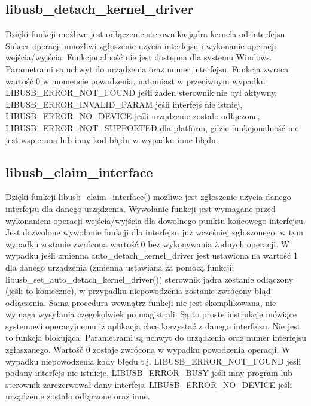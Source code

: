 \documentclass{BscUS}
\begin{document}
\subsection{libusb\_detach\_kernel\_driver}
\noindent Dzięki funkcji możliwe jest odłączenie sterownika jądra kernela od interfejsu.
Sukces operacji umożliwi zgłoszenie użycia interfejsu i wykonanie operacji wejścia/wyjścia.
Funkcjonalność nie jest dostępna dla systemu Windows.
Parametrami są uchwyt do urządzenia oraz numer interfejsu.
Funkcja zwraca wartość 0 w momencie powodzenia, natomiast w przeciwnym wypadku LIBUSB\_ERROR\_NOT\_FOUND jeśli żaden sterownik nie był aktywny, LIBUSB\_ERROR\_INVALID\_PARAM jeśli interfejs nie istniej, LIBUSB\_ERROR\_NO\_DEVICE jeśli urządzenie zostało odłączone, LIBUSB\_ERROR\_NOT\_SUPPORTED dla platform, gdzie funkcjonalność nie jest wspierana lub inny kod błędu w wypadku inne błędu.
\subsection{libusb\_claim\_interface}
\noindent Dzięki funkcji libusb\_claim\_interface() możliwe jest zgłoszenie użycia danego interfejsu dla danego urządzenia.
Wywołanie funkcji jest wymagane przed wykonaniem operacji wejścia/wyjścia dla dowolnego punktu końcowego interfejsu.
Jest dozwolone wywołanie funkcji dla interfejsu już wcześniej zgłoszonego, w tym wypadku zostanie zwrócona wartość 0 bez wykonywania żadnych operacji.
W wypadku jeśli zmienna auto\_detach\_kernel\_driver jest ustawiona na wartość 1 dla danego urządzenia (zmienna ustawiana za pomocą funkcji: libusb\_set\_auto\_detach\_kernel\_driver()) sterownik jądra zostanie odłączony (jeśli to konieczne), w przypadku niepowodzenia zostanie zwrócony błąd odłączenia.
Sama procedura wewnątrz funkcji nie jest skomplikowana, nie wymaga wysyłania czegokolwiek po magistrali. Są to proste instrukcje mówiące systemowi operacyjnemu iż aplikacja chce korzystać z danego interfejsu.
Nie jest to funkcja blokująca.
Parametrami są uchwyt do urządzenia oraz numer interfejsu zgłaszanego.
Wartość 0 zostaje zwrócona w wypadku powodzenia operacji.
W wypadku niepowodzenia kody błędu t.j. LIBUSB\_ERROR\_NOT\_FOUND jeśli podany interfejs nie istnieje, LIBUSB\_ERROR\_BUSY jeśli inny program lub sterownik zarezerwował dany interfejs, LIBUSB\_ERROR\_NO\_DEVICE jeśli urządzenie zostało odłączone oraz inne.
\end{document}
